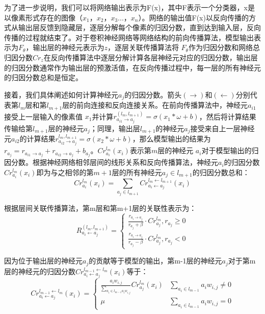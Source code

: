 为了进一步说明，我们可以将网络输出表示为F(x)，其中F表示一个分类器，x是以像素形式存在的图像（$x_{1}$，$x_{2}$，$x_{3}$...，$x_{n}$）。网络的输出值F(x)以反向传播的方式从输出层反馈到隐藏层，逐层分解每个像素的归因分数，直到达到输入层，反向传播的过程就结束了。对于卷积神经网络等网络结构的前向传播算法，模型输出表示为$F_{\theta}$，输出层的神经元表示为$z$，逐层关联传播算法将 $F_{\theta}$作为归因分数和网络总归因分数$Cr_{z}$在反向传播算法中逐层分解计算各层神经元对应的归因分数，输出层的归因分数通常作为输出层的预激活值，在反向传播过程中，每一层的所有神经元的归因分数总和是恒定。

接着，我们具体阐述如何计算神经元$a_{j}$的归因分数。箭头$(\rightarrow)$和$(\leftarrow)$分别代表第$l_{m}$层和第$l_{m+1}$层的前向连接和反向连接关系。在前向传播算法中，神经元$a_{i1}$接受上一层输入的像素值 $x_{1}$并计算$r_{a_{i1} \rightarrow a_{j}}^{(l_{m}, l_{m+1})}=\sigma\left(x_{1} * \omega+b\right)$，然后将计算结果传输给第$l_{m+1}$层的神经元$a_{j}$；同理，输出层$l_{m+1}$的神经元$a_{j}$接受来自上一层神经元$a_{i2}$的计算结果$r_{a_{i2} \rightarrow a_{j}}^{l_{m}, l_{m+1}}=\sigma\left(x_{2} * \omega+b\right)$，那么模型输出的结果为$r_{a_{j}}=r_{a_{i1} \rightarrow a_{j}}+r_{a_{i2} \rightarrow a_{j}}+b_{a_{j}}$。$C r_{a_{i}}^{l_{m}}\left(x_{i}\right)$表示第$m$层的神经元 $a_{i}$对于模型输出的归因分数。根据神经网络相邻层间的线形关系和反向传播算法，神经元$a_{i}$的归因分数$Cr_{a_{i}}^{l_{m}}\left(x_{i}\right)$即为与之相邻的第$m+1$层的所有神经元${a_{j}\in l_{m+1}}$的归因分数总和：
$$
Cr_{a_{i}}^{l_{m}}\left(x_{i}\right)=\sum_{a_{j} \in l_{m+1}} Cr_{a_{i} \leftarrow a_{j}}^{l_{m} \leftarrow l_{m+1}}\left(x_{i}\right)
$$

根据层间关联传播算法，第m层和第m+1层的关联性表示为：
$$
R_{a_{i} \leftarrow a_{j}}^{(l_{m}, l_{m+1})}=\left\{\begin{array}{l}\frac{r_{a_{i}  \rightarrow a_{j} }}{r_{a_{j}}+\beta} \cdot C r_{a_{j}}^{l_{m} }, r_{a_{j}} \geq 0 \\ \frac{r_{a_{i} \rightarrow a_{j} }}{r_{a_{j} }-\beta} \cdot C r_{a_{j}}^{l_{m} }, r_{a_{j}}<0\end{array}\right.
$$

因为位于输出层的神经元$a_{j}$的贡献等于模型的输出，第m-1层的神经元$a_{j}$对于第m层的神经元的归因分数$Cr_{a_{i} \leftarrow a_{j}}^{l_{m-1} \leftarrow l_{m}}\left(x_{i}\right)$等于：
\begin{equation}
Cr_{a_{i} \leftarrow a_{j}}^{l_{m-1} \leftarrow l_{m}}\left(x_{i}\right)=\left\{\begin{array}{cc}\frac{a_{i} w_{i, j}}{\sum_{a_{i} \in l_{m-1} a_{i} w_{i, j}}} Cr_{a_{j}}^{l_{m}}\left(x_{i}\right) & \sum_{a_{i} \in l_{m-1}} a_{i} w_{i, j} \neq 0 \\ \mu & \sum_{a_{i} \in l_{m-1}} a_{i} w_{i, j}=0\end{array}\right.
\end{equation}

